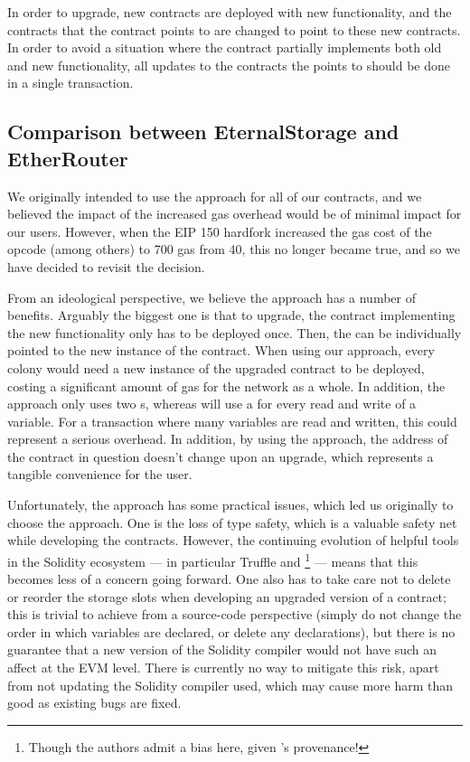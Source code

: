 In order to upgrade, new contracts are deployed with new functionality, and the contracts that the  contract points to are changed to point to these new contracts. In order to avoid a situation where the contract partially implements both old and new functionality, all updates to the contracts the  points to should be done in a single transaction.

\subsection{Comparison between EternalStorage and EtherRouter}

We originally intended to use the  approach for all of our contracts, and we believed the impact of the increased gas overhead would be of minimal impact for our users.  However, when the EIP 150 hardfork\cite{EIP150} increased the gas cost of the opcode  (among others) to 700 gas from 40, this no longer became true, and so we have decided to revisit the decision.

From an ideological perspective, we believe the  approach has a number of benefits. Arguably the biggest one is that to upgrade, the contract implementing the new functionality only has to be deployed once. Then, the  can be individually pointed to the new instance of the contract. When using our  approach, every colony would need a new instance of the upgraded contract to be deployed, costing a significant amount of gas for the network as a whole. In addition, the  approach only uses two s, whereas  will use a  for every read and write of a variable. For a transaction where many variables are read and written, this could represent a serious overhead. In addition, by using the  approach, the address of the contract in question doesn't change upon an upgrade, which represents a tangible convenience for the user.

Unfortunately, the  approach has some practical issues, which led us originally to choose the   approach. One is the loss of type safety, which is a valuable safety net while developing the contracts. However, the continuing evolution of helpful tools in the Solidity ecosystem --- in particular Truffle and  \footnote{Though the authors admit a bias here, given 's provenance!} --- means that this becomes less of a concern going forward. One also has to take care not to delete or reorder the storage slots when developing an upgraded version of a contract; this is trivial to achieve from a source-code perspective (simply do not change the order in which variables are declared, or delete any declarations), but there is no guarantee that a new version of the Solidity compiler would not have such an affect at the EVM level. There is currently no way to mitigate this risk, apart from not updating the Solidity compiler used, which may cause more harm than good as existing bugs are fixed.

